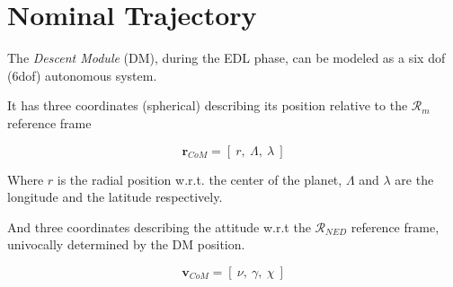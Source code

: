\chapter{Nominal Trajectory}

The \textit{Descent Module} (DM), during the EDL phase, can be modeled as a
six dof (6dof) autonomous system.

It has three coordinates (spherical) describing its position relative to the
$\mathcal{R}_{m}$ reference frame

        $$
            \textbf{r}_{CoM} = [\: r,\:\Lambda,\:\lambda \:]
        $$

\noindent Where $r$ is the radial position w.r.t. the center of the planet, $\Lambda$ and $\lambda$ are 
the longitude and the latitude respectively.

And three coordinates describing the attitude w.r.t the $\mathcal{R}_{NED}$ reference frame, univocally
determined by the DM position.

        $$
            \textbf{v}_{CoM} = [\: \nu,\:\gamma,\:\chi \:]
        $$
